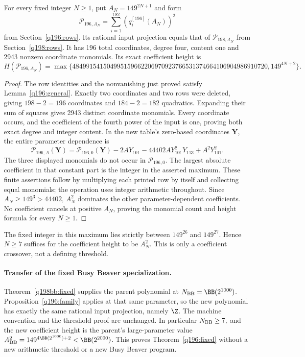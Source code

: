 \begin{proposition}\label{q196:family}
For every fixed integer $N\ge1$, put $A_N=149^{2N+1}$ and form
\[
 \mathcal P_{196,A_N}=\sum_{i=1}^{182}(q_i^{[196]}(A_N))^2
\]
from Section~\ref{q196:rows}. Its rational input projection equals that
of $\mathcal P_{198,A_N}$ from Section~\ref{q198:rows}.
It has 196 total coordinates, degree four, content one and 2943 nonzero
coordinate monomials. Its exact coefficient height is
\[
 H(\mathcal P_{196,A_N})=
 \max\{484991541504995159662206970923766531374664106904986910720,
       149^{4N+2}\}.
\]
\end{proposition}
\begin{proof}
The row identities and the nonvanishing just proved satisfy
Lemma~\ref{q196:general}. Exactly two coordinates and two rows were
deleted, giving $198-2=196$ coordinates and $184-2=182$ quadratics.
Expanding their sum of squares gives 2943 distinct coordinate monomials.
Every coordinate occurs, and the coefficient of the fourth power of the
input is one, proving both exact degree and integer content.
In the new table's zero-based coordinates $\mathbf Y$, the entire
parameter dependence is
\[
 \mathcal P_{196,A}(\mathbf Y)=\mathcal P_{196,0}(\mathbf Y)
 -2AY_{101}-44402AY_{101}^{2}Y_{113}+A^2Y_{101}^{2}.
\]
The three displayed monomials do not occur in $\mathcal P_{196,0}$.
The largest absolute coefficient in that constant part is the integer
in the asserted maximum. These finite assertions follow by multiplying
each printed row by itself and collecting equal monomials; the operation
uses integer arithmetic throughout. Since $A_N\ge149^3>44402$,
$A_N^2$ dominates the other parameter-dependent coefficients. No
coefficient cancels at positive $A_N$, proving the monomial count and
height formula for every $N\ge1$.
\end{proof}

The fixed integer in this maximum lies strictly between $149^{26}$
and $149^{27}$. Hence $N\ge7$ suffices for the coefficient height to be
$A_N^2$. This is only a coefficient crossover, not a defining threshold.

\paragraph{Transfer of the fixed Busy Beaver specialization.}
Theorem~\ref{q198bb:fixed} supplies the parent polynomial at
$N_{\rm BB}=\BB(2^{1000})$. Proposition~\ref{q196:family} applies
at that same parameter, so the new polynomial has exactly the same
rational input projection, namely $\Z$. The machine convention and
the threshold proof are unchanged. In particular $N_{\rm BB}\ge7$,
and the new coefficient height is the parent's large-parameter value
$A_{\rm BB}^2=149^{4\BB(2^{1000})+2}<\BB(2^{2000})$.
This proves Theorem~\ref{q196:fixed} without a new arithmetic threshold
or a new Busy Beaver program.
